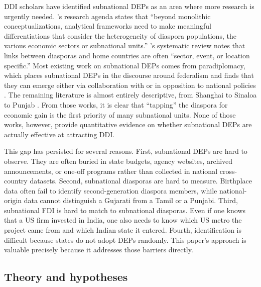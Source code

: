 \documentclass[12pt]{article}
\begin{document}
DDI scholars have identified subnational DEPs as an area where more research is urgently needed. \citet{naujoks_transnational_2022}'s research agenda states that ``beyond monolithic conceptualizations, analytical frameworks need to make meaningful differentiations that consider the heterogeneity of diaspora populations, the various economic sectors or subnational units.'' \citet{gevorkyan_diaspora_2022}'s systematic review notes that links between diasporas and home countries are often ``sector, event, or location specific.'' Most existing work on subnational DEPs comes from paradiplomacy, which places subnational DEPs in the discourse around federalism and finds that they can emerge either via collaboration with or in opposition to national policies \citep{liu_chinese_2020, sharma_partisan_2020}. The remaining literature is almost entirely descriptive, from Shanghai to Sinaloa to Punjab \citep{hasic_diaspora-management_2020, rivera_indifferent_2019, thandi_punjab_2014}. From those works, it is clear that ``tapping'' the diaspora for economic gain is the first priority of many subnational units. None of those works, however, provide quantitative evidence on whether subnational DEPs are actually effective at attracting DDI.

This gap has persisted for several reasons. First, subnational DEPs are hard to observe. They are often buried in state budgets, agency websites, archived announcements, or one-off programs rather than collected in national cross-country datasets. Second, subnational diasporas are hard to measure. Birthplace data often fail to identify second-generation diaspora members, while national-origin data cannot distinguish a Gujarati from a Tamil or a Punjabi. Third, subnational FDI is hard to match to subnational diasporas. Even if one knows that a US firm invested in India, one also needs to know which US metro the project came from and which Indian state it entered. Fourth, identification is difficult because states do not adopt DEPs randomly. This paper's approach is valuable precisely because it addresses those barriers directly.

\subsection{Theory and hypotheses}
\end{document}
